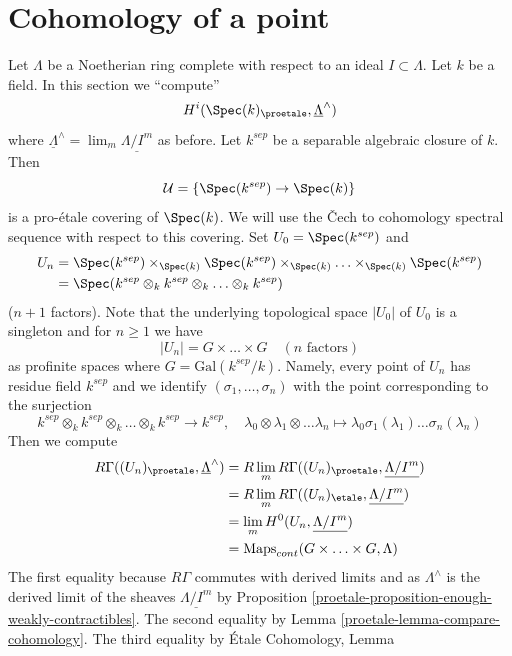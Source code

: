 \section{Cohomology of a point}
\label{proetale-section-cohomology-point}
Let $\Lambda$ be a Noetherian ring complete with respect to an ideal
$I \subset \Lambda$. Let $k$ be a field. In this section we ``compute''
$$
H^i(\Spec(k)_\proetale, \underline{\Lambda}^\wedge)
$$
where $\underline{\Lambda}^\wedge = \lim_m \underline{\Lambda/I^m}$ as before.
Let $k^{sep}$ be a separable algebraic closure of $k$.
Then
$$
\mathcal{U} = \{\Spec(k^{sep}) \to \Spec(k)\}
$$
is a pro-\'etale covering of $\Spec(k)$. We will use the {\v C}ech
to cohomology spectral sequence with respect to this covering.
Set $U_0 = \Spec(k^{sep})$ and
\begin{align*}
U_n & =
\Spec(k^{sep}) \times_{\Spec(k)}
\Spec(k^{sep}) \times_{\Spec(k)} \ldots
\times_{\Spec(k)} \Spec(k^{sep}) \\
& =
\Spec(k^{sep} \otimes_k k^{sep} \otimes_k \ldots \otimes_k k^{sep})
\end{align*}
($n + 1$ factors). Note that the underlying topological space
$|U_0|$ of $U_0$ is a singleton and for $n \geq 1$ we have
$$
|U_n| = G \times \ldots \times G\quad (n\text{ factors})
$$
as profinite spaces where $G = \text{Gal}(k^{sep}/k)$. Namely, every
point of $U_n$ has residue field $k^{sep}$ and we identify
$(\sigma_1, \ldots, \sigma_n)$ with the point corresponding to the
surjection
$$
k^{sep} \otimes_k k^{sep} \otimes_k \ldots \otimes_k k^{sep}
\longrightarrow k^{sep}, \quad
\lambda_0 \otimes \lambda_1 \otimes \ldots \lambda_n
\longmapsto \lambda_0 \sigma_1(\lambda_1) \ldots \sigma_n(\lambda_n)
$$
Then we compute
\begin{align*}
R\Gamma((U_n)_\proetale, \underline{\Lambda}^\wedge)
& =
R\lim_m R\Gamma((U_n)_\proetale, \underline{\Lambda/I^m}) \\
& =
R\lim_m R\Gamma((U_n)_\etale, \underline{\Lambda/I^m}) \\
& =
\lim_m H^0(U_n, \underline{\Lambda/I^m}) \\
& =
\text{Maps}_{cont}(G \times \ldots \times G, \Lambda)
\end{align*}
The first equality because $R\Gamma$ commutes with derived limits
and as $\Lambda^\wedge$ is the derived limit of the sheaves
$\underline{\Lambda/I^m}$ by
Proposition \ref{proetale-proposition-enough-weakly-contractibles}.
The second equality by Lemma \ref{proetale-lemma-compare-cohomology}.
The third equality by \'Etale Cohomology, Lemma
